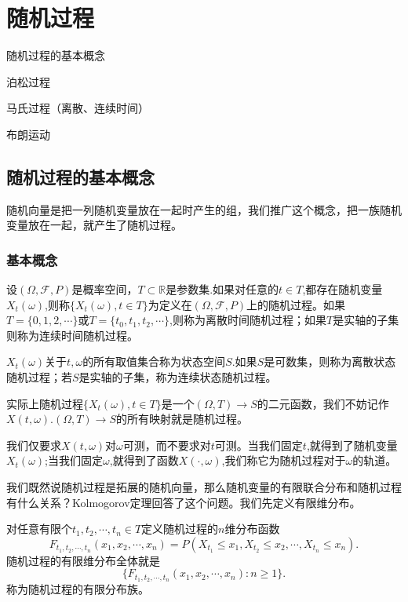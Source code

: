 \documentclass[lang=cn,10pt]{elegantbook}
\begin{document}
	
	\chapter{随机过程}
	\begin{introduction}
		\item 随机过程的基本概念
		\item 泊松过程
		\item 马氏过程（离散、连续时间）
		\item 布朗运动
	\end{introduction}
	\section{随机过程的基本概念}
	随机向量是把一列随机变量放在一起时产生的组，我们推广这个概念，把一族随机变量放在一起，就产生了随机过程。
	\subsection{基本概念}
	\begin{definition}[随机过程]
		设\((\Omega,\mathcal{F},P)\)是概率空间，\(T\subset \mathbb{R}\)是参数集.如果对任意的\(t\in T\),都存在随机变量\(X_t(\omega)\),则称\(\{X_t(\omega),t\in T\}\)为定义在\((\Omega,\mathcal{F},P)\)上的随机过程。如果\(T=\{0,1,2,\cdots\}\)或\(T=\{t_0,t_1,t_2,\cdots\}\),则称为离散时间随机过程；如果\(T\)是实轴的子集则称为连续时间随机过程。

		\(X_t(\omega)\)关于\(t,\omega\)的所有取值集合称为状态空间\(S\).如果\(S\)是可数集，则称为离散状态随机过程；若\(S\)是实轴的子集，称为连续状态随机过程。
	\end{definition}
	\begin{note}
		实际上随机过程\(\{X_t(\omega),t\in T\}\)是一个\((\Omega,T)\to S\)的二元函数，我们不妨记作\(X(t,\omega)\).\((\Omega,T)\to S\)的所有映射就是随机过程。
		
		我们仅要求\(X(t,\omega)\)对\(\omega\)可测，而不要求对\(t\)可测。当我们固定\(t\),就得到了随机变量\(X_t(\omega)\);当我们固定\(\omega\),就得到了函数\(X(\cdot,\omega)\),我们称它为随机过程对于\(\omega\)的轨道。
	\end{note}
	我们既然说随机过程是拓展的随机向量，那么随机变量的有限联合分布和随机过程有什么关系？Kolmogorov定理回答了这个问题。我们先定义有限维分布。
	\begin{definition}[有限维分布]
		对任意有限个\(t_1,t_2,\cdots,t_n\in T\)定义随机过程的\(n\)维分布函数
		\[F_{t_1,t_2,\cdots,t_n}(x_1,x_2,\cdots,x_n)=P(X_{t_1}\le x_1,X_{t_2}\le x_2,\cdots,X_{t_n}\le x_n).\]
		随机过程的有限维分布全体就是
		\[\{F_{t_1,t_2,\cdots,t_n}(x_1,x_2,\cdots,x_n):n\ge 1\}.\]
		称为随机过程的有限分布族。
	\end{definition}
\end{document}
